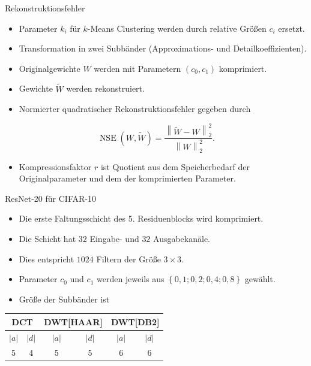 \documentclass[aspectratio=169, 12pt]{beamer}
\DeclareMathOperator{\NSE}{NSE}
\begin{document}
\begin{frame}{Rekonstruktionsfehler}
  \begin{itemize}
    \item Parameter $k_i$ für $k$-Means Clustering werden durch relative Größen $c_i$ ersetzt.
    \item Transformation in zwei Subbänder (Approximations- und Detailkoeffizienten).
    \item Originalgewichte $W$ werden mit Parametern $(c_0, c_1)$ komprimiert.
    \item Gewichte $\widetilde{W}$ werden rekonstruiert.
    \item Normierter quadratischer Rekonstruktionsfehler gegeben durch
  \end{itemize}
  \begin{small}
    \begin{equation*}
      \NSE(W, \widetilde{W}) = \frac{\left\lVert \widetilde{W} - W \right\rVert_2^2}{\left\lVert W \right\rVert_2^2}.
    \end{equation*}
  \end{small}
  \begin{itemize}
    \item Kompressionsfaktor $r$ ist Quotient aus dem Speicherbedarf der Originalparameter und dem der komprimierten Parameter.
  \end{itemize}
  
\end{frame}

\begin{frame}{ResNet-20 für CIFAR-10}
  \begin{itemize}
    \item Die erste Faltungsschicht des 5. Residuenblocks wird komprimiert.
    \item Die Schicht hat $32$ Eingabe- und $32$ Ausgabekanäle.
    \item Dies entspricht $1024$ Filtern der Größe $3 \times 3$.
    \item Parameter $c_0$ und $c_1$ werden jeweils aus $\left\lbrace 0{,}1; 0{,}2; 0{,}4; 0{,}8 \right\rbrace$ gewählt.
    \item Größe der Subbänder ist
  \end{itemize}
  \begin{table}[H]
    \centering
    \begin{tabular}{|c|c|c|c|c|c|}
        \hline
        \multicolumn{2}{|c|}{DCT} & \multicolumn{2}{|c|}{DWT[HAAR]} & \multicolumn{2}{|c|}{DWT[DB2]} \\
        \hline
        $\left\lvert a \right\rvert$ & $\left\lvert d \right\rvert$ & $\left\lvert a \right\rvert$ & $\left\lvert d \right\rvert$ & $\left\lvert a \right\rvert$ & $\left\lvert d \right\rvert$ \\
        \hline
        5 & 4 & 5 & 5 & 6 & 6 \\
        \hline
    \end{tabular}
\end{table}
\end{frame}
\end{document}
